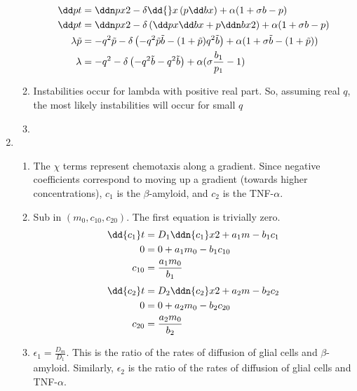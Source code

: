 \documentclass{X:/Documents/Coding/Latex/myassignment}
\begin{document}
\begin{enumerate}
\begin{enumerate}
		\begin{align*}
			\dd pt &= \ddn px2 - \delta \dd{}x \left(p \dd bx\right) + \alpha (1 + \sigma b -p)\\
			\dd pt &= \ddn px2 - \delta \left(\dd px \dd bx + p \ddn bx2\right) + \alpha (1 + \sigma b -p)\\
			\lambda \tilde{p} &= -q^2 \tilde{p} - \delta\left(-q ^2\tilde p \tilde b - (1+ \tilde{p})q^2 \tilde{b}\right)+ \alpha (1 + \sigma \tilde{b} - (1 + \tilde{p}))\\
			\lambda &= -q^2 - \delta\left(-q ^2\tilde b - q^2 \tilde{b}\right)+ \alpha (\sigma \frac{b_1}{p_1} - 1)\\
		\end{align*}

		\item Instabilities occur for lambda with positive real part. So, assuming real $q$, the most likely instabilities will occur for small $q$
		\item 
	\end{enumerate}
	\item 
	\begin{enumerate}
		\item The $\chi$ terms represent chemotaxis along a gradient. Since negative coefficients correspond to moving up a gradient (towards higher concentrations), $c_1$ is the $\beta$-amyloid, and $c_2$ is the TNF-$\alpha$.
		\item Sub in $(m_0,c_{10},c_{20})$. The first equation is trivially zero.
		\begin{align*}
			\dd{c_1} t &= D_1 \ddn{c_1}x2 + a_1 m - b_1 c_1\\
			0 &= 0 + a_1m_0 - b_1 c_{10}\\
			c_{10} &= \frac{a_1 m_0}{b_1}
		\end{align*}
		\begin{align*}
			\dd{c_2} t &= D_2 \ddn{c_2}x2 + a_2 m - b_2c_2\\
			0 &= 0 + a_2 m_0 - b_2 c_{20}\\
			c_{20} &= \frac{a_2 m_0}{b_2}
		\end{align*}
		\item $\epsilon_1 = \frac{D_m}{D_1}$. This is the ratio of the rates of diffusion of glial cells and $\beta$-amyloid. Similarly, $\epsilon_2$ is the ratio of the rates of diffusion of glial cells and TNF-$\alpha$.

\end{enumerate}
\end{enumerate}
\end{document}
